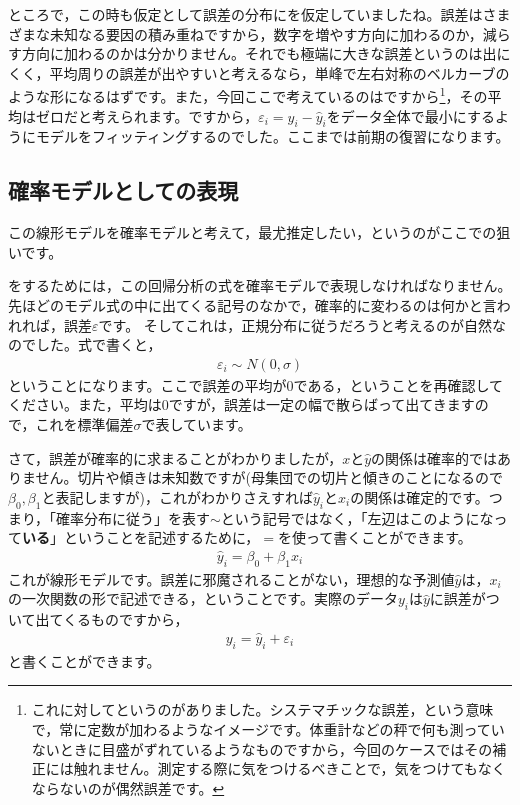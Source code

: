 \documentclass{ltjbook}
\begin{document}
ところで，この時も仮定として誤差の分布にを仮定していましたね。誤差はさまざまな未知なる要因の積み重ねですから，数字を増やす方向に加わるのか，減らす方向に加わるのかは分かりません。それでも極端に大きな誤差というのは出にくく，平均周りの誤差が出やすいと考えるなら，単峰で左右対称のベルカーブのような形になるはずです。また，今回ここで考えているのはですから\footnote{これに対してというのがありました。システマチックな誤差，という意味で，常に定数が加わるようなイメージです。体重計などの秤で何も測っていないときに目盛がずれているようなものですから，今回のケースではその補正には触れません。測定する際に気をつけるべきことで，気をつけてもなくならないのが偶然誤差です。}，その平均はゼロだと考えられます。ですから，$\varepsilon_i = y_i - \hat{y}_i$をデータ全体で最小にするようにモデルをフィッティングするのでした。ここまでは前期の復習になります。

\subsection{確率モデルとしての表現}
この線形モデルを確率モデルと考えて，最尤推定したい，というのがここでの狙いです。

をするためには，この回帰分析の式を確率モデルで表現しなければなりません。先ほどのモデル式の中に出てくる記号のなかで，確率的に変わるのは何かと言われれば，誤差$\varepsilon$です。
そしてこれは，正規分布に従うだろうと考えるのが自然なのでした。式で書くと，
\begin{align}
\varepsilon_i \sim N(0,\sigma)
\end{align}
ということになります。ここで誤差の平均が0である，ということを再確認してください。また，平均は0ですが，誤差は一定の幅で散らばって出てきますので，これを標準偏差$\sigma$で表しています。

さて，誤差が確率的に求まることがわかりましたが，$x$と$\hat{y}$の関係は確率的ではありません。切片や傾きは未知数ですが(母集団での切片と傾きのことになるので$\beta_0,\beta_1$と表記しますが)，これがわかりさえすれば$\hat{y}_i$と$x_i$の関係は確定的です。つまり，「確率分布に従う」を表す$\sim$という記号ではなく，「左辺はこのようになって\textbf{いる}」ということを記述するために，$=$を使って書くことができます。
\begin{align}
\hat{y}_i = \beta_0 + \beta_1 x_i
\end{align}
これが線形モデルです。誤差に邪魔されることがない，理想的な予測値$\hat{y}$は，$x_i$の一次関数の形で記述できる，ということです。実際のデータ$y_i$は$\hat{y}$に誤差がついて出てくるものですから，
\begin{align}
y_i = \hat{y}_i + \varepsilon_i
\end{align}
と書くことができます。
\end{document}
